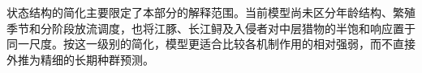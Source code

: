 状态结构的简化主要限定了本部分的解释范围。当前模型尚未区分年龄结构、繁殖季节和分阶段放流调度，也将江豚、长江鲟及入侵者对中层猎物的半饱和响应置于同一尺度。按这一级别的简化，模型更适合比较各机制作用的相对强弱，而不直接外推为精细的长期种群预测。
